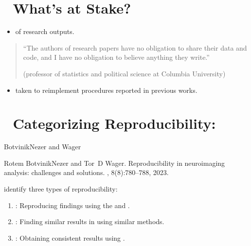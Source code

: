 \documentclass[letterpaper,10pt,english]{jupyterBook}
\begin{document}
\section{🤔 What’s at Stake?}
\label{\detokenize{chapters/01/reproducibility-in-neuroimaging:what-s-at-stake}}\begin{itemize}
\item {} 
\sphinxAtStartPar
{} of research outputs.

\end{itemize}
\begin{quote}

\sphinxAtStartPar
“The authors of research papers have no obligation to share their data and code, and I have no obligation to believe anything they write.”

\sphinxAtStartPar
{} (professor of statistics and political science at Columbia University)
\end{quote}
\begin{itemize}
\item {} 
\sphinxAtStartPar
{} taken to re\sphinxhyphen{}implement procedures reported in previous works.

\end{itemize}


\section{🔀 Categorizing Reproducibility:}
\label{\detokenize{chapters/01/reproducibility-in-neuroimaging:categorizing-reproducibility}}
\sphinxAtStartPar
Botvinik\sphinxhyphen{}Nezer and Wager%
\begin{footnote}[2]\sphinxAtStartFootnote
Rotem Botvinik\sphinxhyphen{}Nezer and Tor D Wager. Reproducibility in neuroimaging analysis: challenges and solutions. , 8(8):780–788, 2023.
%
\end{footnote} identify three types of reproducibility:
\begin{enumerate}
%
\item {} 
\sphinxAtStartPar
{}: Reproducing findings using the  and .

\item {} 
\sphinxAtStartPar
{}: Finding similar results in  using similar methods.

\item {} 
\sphinxAtStartPar
{}: Obtaining consistent results using .

\end{enumerate}
\end{document}
